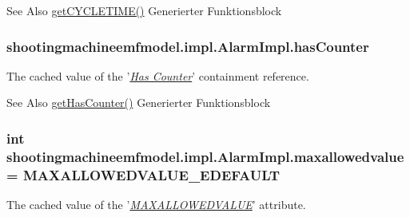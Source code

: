\begin{DoxySeeAlso}{See Also}
\hyperlink{classshootingmachineemfmodel_1_1impl_1_1_alarm_impl_a5bf352e51eec89bd76092fb853ddde24}{get\-C\-Y\-C\-L\-E\-T\-I\-M\-E()} Generierter Funktionsblock  
\end{DoxySeeAlso}
\hypertarget{classshootingmachineemfmodel_1_1impl_1_1_alarm_impl_ac48b4b9a1a543ec8b9ee89cc128ac673}{
\subsubsection[{has\-Counter}]{ shootingmachineemfmodel.\-impl.\-Alarm\-Impl.\-has\-Counter\hspace{0.3cm}{\ttfamily [protected]}}}\label{classshootingmachineemfmodel_1_1impl_1_1_alarm_impl_ac48b4b9a1a543ec8b9ee89cc128ac673}
The cached value of the '\hyperlink{classshootingmachineemfmodel_1_1impl_1_1_alarm_impl_ae1054cff563ee62880b1aef16914bf3d}{{\itshape Has Counter}}' containment reference.

\begin{DoxySeeAlso}{See Also}
\hyperlink{classshootingmachineemfmodel_1_1impl_1_1_alarm_impl_ae1054cff563ee62880b1aef16914bf3d}{get\-Has\-Counter()} Generierter Funktionsblock  
\end{DoxySeeAlso}
\hypertarget{classshootingmachineemfmodel_1_1impl_1_1_alarm_impl_a63897cf99fd1eba61bc5fd9aa6d168ca}{
\subsubsection[{maxallowedvalue}]{\setlength{\rightskip}{0pt plus 5cm}int shootingmachineemfmodel.\-impl.\-Alarm\-Impl.\-maxallowedvalue = {\bf M\-A\-X\-A\-L\-L\-O\-W\-E\-D\-V\-A\-L\-U\-E\-\_\-\-E\-D\-E\-F\-A\-U\-L\-T}\hspace{0.3cm}{\ttfamily [protected]}}}\label{classshootingmachineemfmodel_1_1impl_1_1_alarm_impl_a63897cf99fd1eba61bc5fd9aa6d168ca}
The cached value of the '\hyperlink{classshootingmachineemfmodel_1_1impl_1_1_alarm_impl_a4b4fd8f246341c47e1469cb78ac1fd7b}{{\itshape M\-A\-X\-A\-L\-L\-O\-W\-E\-D\-V\-A\-L\-U\-E}}' attribute.

